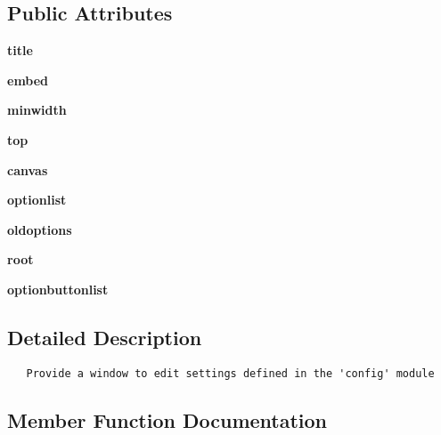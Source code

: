 \subsection*{Public Attributes}
\begin{CompactItemize}
\item 
\textbf{title}\label{classconfigFrame_1_1window_818ffaa4f584e5703371df4e4899d746}

\item 
\textbf{embed}\label{classconfigFrame_1_1window_38119dcbec5148e3e1ac4c70f8356071}

\item 
\textbf{minwidth}\label{classconfigFrame_1_1window_60ba76187ff08eb4d6a003be6eea7bda}

\item 
\textbf{top}\label{classconfigFrame_1_1window_df66ebeada4f6f4e77f4babbcbf7c293}

\item 
\textbf{canvas}\label{classconfigFrame_1_1window_f0d47b9dc39b396a0c863c1c8204e5b5}

\item 
\textbf{optionlist}\label{classconfigFrame_1_1window_189c7502b4fec783ee6bb92c4bea60a6}

\item 
\textbf{oldoptions}\label{classconfigFrame_1_1window_91109bfb6bc432ae55ec42e9a32687a2}

\item 
\textbf{root}\label{classconfigFrame_1_1window_9280084b54466b46d28b5df01579dd68}

\item 
\textbf{optionbuttonlist}\label{classconfigFrame_1_1window_80aae05fd345bcbd5fe80afc0aa2c2c4}

\end{CompactItemize}


\subsection{Detailed Description}


\footnotesize\begin{verbatim}
   Provide a window to edit settings defined in the 'config' module
\end{verbatim}
\normalsize
 



\subsection{Member Function Documentation}
